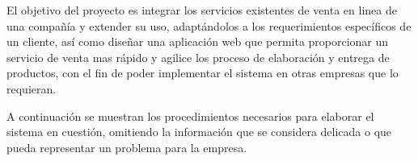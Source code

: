 El objetivo del proyecto es integrar los servicios existentes de venta en linea de una compañía y extender su uso, adaptándolos a los requerimientos específicos de un cliente, así como diseñar una aplicación web que permita proporcionar un servicio de venta mas rápido y agilice los proceso de elaboración y entrega de productos, con el fin de poder implementar el sistema en otras empresas que lo requieran.
\vspace{0.8cm}

A continuación se muestran los procedimientos necesarios para elaborar el sistema en cuestión, omitiendo la información que se considera delicada o que pueda representar un problema para la empresa.